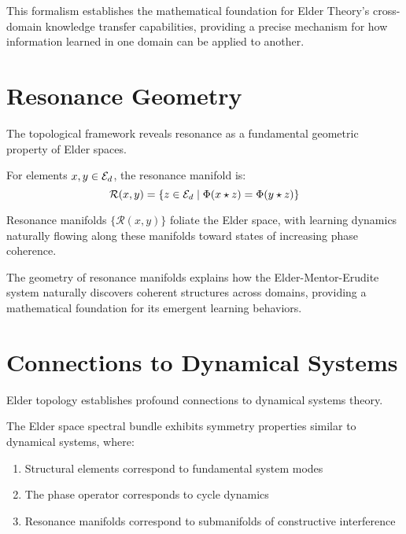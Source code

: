 This formalism establishes the mathematical foundation for Elder Theory's cross-domain knowledge transfer capabilities, providing a precise mechanism for how information learned in one domain can be applied to another.

\section{Resonance Geometry}

The topological framework reveals resonance as a fundamental geometric property of Elder spaces.

\begin{definition}
For elements $x, y \in \mathcal{E}_{d}$, the resonance manifold is:
\begin{equation}
\mathcal{R}(x, y) = \{z \in \mathcal{E}_{d} \mid \Phi(x \star z) = \Phi(y \star z)\}
\end{equation}
\end{definition}

\begin{theorem}
Resonance manifolds $\{\mathcal{R}(x, y)\}$ foliate the Elder space, with learning dynamics naturally flowing along these manifolds toward states of increasing phase coherence.
\end{theorem}

The geometry of resonance manifolds explains how the Elder-Mentor-Erudite system naturally discovers coherent structures across domains, providing a mathematical foundation for its emergent learning behaviors.

\section{Connections to Dynamical Systems}

Elder topology establishes profound connections to dynamical systems theory.

\begin{theorem}
The Elder space spectral bundle exhibits symmetry properties similar to dynamical systems, where:
\begin{enumerate}
    \item Structural elements correspond to fundamental system modes
    \item The phase operator corresponds to cycle dynamics
    \item Resonance manifolds correspond to submanifolds of constructive interference
\end{enumerate}
\end{theorem}

